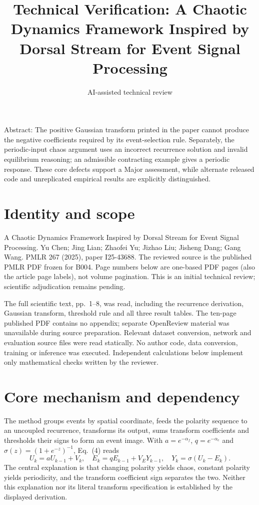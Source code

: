 \documentclass[10pt]{article}
\title{Technical Verification: A Chaotic Dynamics Framework Inspired by Dorsal Stream for Event Signal Processing}
\author{AI-assisted technical review}
\date{}
\begin{document}
\maketitle
Abstract: The positive Gaussian transform printed in the paper cannot produce the negative coefficients required by its event-selection rule. Separately, the periodic-input chaos argument uses an incorrect recurrence solution and invalid equilibrium reasoning; an admissible contracting example gives a periodic response. These core defects support a Major assessment, while alternate released code and unreplicated empirical results are explicitly distinguished.\par
\section*{Identity and scope}
A Chaotic Dynamics Framework Inspired by Dorsal Stream for Event Signal Processing. Yu Chen; Jing Lian; Zhaofei Yu; Jizhao Liu; Jisheng Dang; Gang Wang. PMLR 267 (2025), paper I25-43688. The reviewed source is the published PMLR PDF frozen for B004. Page numbers below are one-based PDF pages (also the article page labels), not volume pagination. This is an initial technical review; scientific adjudication remains pending.\par
The full scientific text, pp. 1–8, was read, including the recurrence derivation, Gaussian transform, threshold rule and all three result tables. The ten-page published PDF contains no appendix; separate OpenReview material was unavailable during source preparation. Relevant dataset conversion, network and evaluation source files were read statically. No author code, data conversion, training or inference was executed. Independent calculations below implement only mathematical checks written by the reviewer.\par
\section*{Core mechanism and dependency}
The method groups events by spatial coordinate, feeds the polarity sequence to an uncoupled recurrence, transforms its output, sums transform coefficients and thresholds their signs to form an event image. With \(a=e^{-\alpha_f}\), \(q=e^{-\alpha_e}\) and \(\sigma(z)=(1+e^{-z})^{-1}\), Eq. (4) reads \[U_k=aU_{k-1}+V_k,\quad E_k=qE_{k-1}+V_EY_{k-1},\quad Y_k=\sigma(U_k-E_k).\] The central explanation is that changing polarity yields chaos, constant polarity yields periodicity, and the transform coefficient sign separates the two. Neither this explanation nor its literal transform specification is established by the displayed derivation.\par
\end{document}
